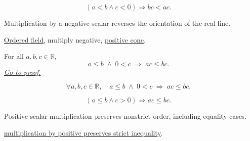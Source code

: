 \begin{remark*}
\[
(a<b\land c<0)\Rightarrow bc<ac.
\]
\end{remark*}

\begin{remark*}[Interpretation]
Multiplication by a negative scalar reverses the orientation of the real line.
\end{remark*}

\begin{dependencies}
\hyperref[def:real-ordered-field]{Ordered field},
multiply negative,
\hyperref[def:positive-cone]{positive cone}.
\end{dependencies}


\begin{theorem}
\label{thm:ineq-nonstrict-multiply-positive}
For all $a, b, c \in \mathbb{R}$,
\[
  a \le b \;\land\; 0 < c \;\Rightarrow\; ac \le bc.
\]
\hyperref[prf:ineq-nonstrict-multiply-positive]{\textit{Go to proof.}}
\end{theorem}



\begin{remark*}
\[
  \forall a, b, c \in \mathbb{R},\quad
  a \le b \;\land\; 0 < c \;\Rightarrow\; ac \le bc.
\]
\end{remark*}

\begin{remark*}
\[
(a\le b\land c>0)\Rightarrow ac\le bc.
\]
\end{remark*}

\begin{remark*}[Interpretation]
Positive scalar multiplication preserves nonstrict order, including equality cases.
\end{remark*}

\begin{dependencies}
\hyperref[thm:ineq-multiply-positive]{multiplication by positive preserves strict inequality}.
\end{dependencies}


